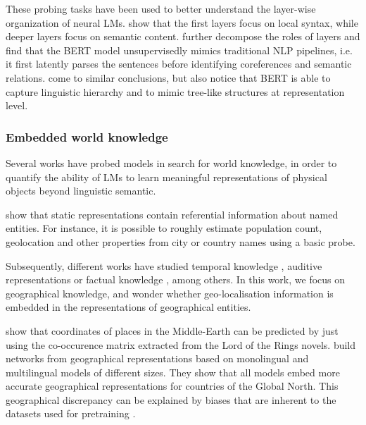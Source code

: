 These probing tasks have been used to better understand the layer-wise organization of neural LMs. \citet{peters-etal-2018-dissecting} show that the first layers focus on local syntax, while deeper layers focus on semantic content. \citet{tenney-etal-2019-bert} further decompose the roles of layers and find that the BERT model unsupervisedly mimics traditional NLP pipelines, i.e. it first latently parses the sentences before identifying coreferences and semantic relations. \citet{jawahar-etal-2019-bert} come to similar conclusions, but also notice that BERT is able to capture linguistic hierarchy and to mimic tree-like structures at representation level.



\subsubsection{Embedded world knowledge}

Several works have probed models in search for world knowledge, in order to quantify the ability of LMs to learn meaningful representations of physical objects beyond linguistic semantic.

\citet{gupta-etal-2015-distributional} show that static representations contain referential information about named entities. For instance, it is possible to roughly estimate population count, geolocation and other properties from city or country names using a basic probe.

Subsequently, different works have studied temporal knowledge \citet{thukral-etal-2021-probing, caselli-etal-2022-time}, auditive representations \citet{ngo2024languagemodelshearprobing} or factual knowledge \citet{youssef-etal-2023-give}, among others. In this work, we focus on geographical knowledge, and wonder whether geo-localisation information is embedded in the representations of geographical entities.

\citet{lotr} show that coordinates of places in the Middle-Earth can be predicted by just using the co-occurence matrix extracted from the Lord of the Rings novels. \citet{faisal-anastasopoulos-2022-geographic} build networks from geographical representations based on monolingual and multilingual models of different sizes. They show that all models embed more accurate geographical representations for countries of the Global North. This geographical discrepancy can be explained by biases that are inherent to the datasets used for pretraining \citet{faisal-etal-2022-dataset}.

